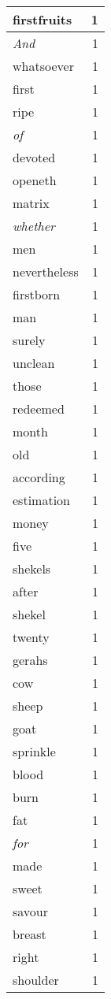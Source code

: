 \begin{center}
\begin{longtable}{l|r}
firstfruits & 1 \\ \hline
\emph{And} & 1 \\ \hline
whatsoever & 1 \\ \hline
first & 1 \\ \hline
ripe & 1 \\ \hline
\emph{of} & 1 \\ \hline
devoted & 1 \\ \hline
openeth & 1 \\ \hline
matrix & 1 \\ \hline
\emph{whether} & 1 \\ \hline
men & 1 \\ \hline
nevertheless & 1 \\ \hline
firstborn & 1 \\ \hline
man & 1 \\ \hline
surely & 1 \\ \hline
unclean & 1 \\ \hline
those & 1 \\ \hline
redeemed & 1 \\ \hline
month & 1 \\ \hline
old & 1 \\ \hline
according & 1 \\ \hline
estimation & 1 \\ \hline
money & 1 \\ \hline
five & 1 \\ \hline
shekels & 1 \\ \hline
after & 1 \\ \hline
shekel & 1 \\ \hline
twenty & 1 \\ \hline
gerahs & 1 \\ \hline
cow & 1 \\ \hline
sheep & 1 \\ \hline
goat & 1 \\ \hline
sprinkle & 1 \\ \hline
blood & 1 \\ \hline
burn & 1 \\ \hline
fat & 1 \\ \hline
\emph{for} & 1 \\ \hline
made & 1 \\ \hline
sweet & 1 \\ \hline
savour & 1 \\ \hline
breast & 1 \\ \hline
right & 1 \\ \hline
shoulder & 1 \\ \hline

\end{longtable}
\end{center}
